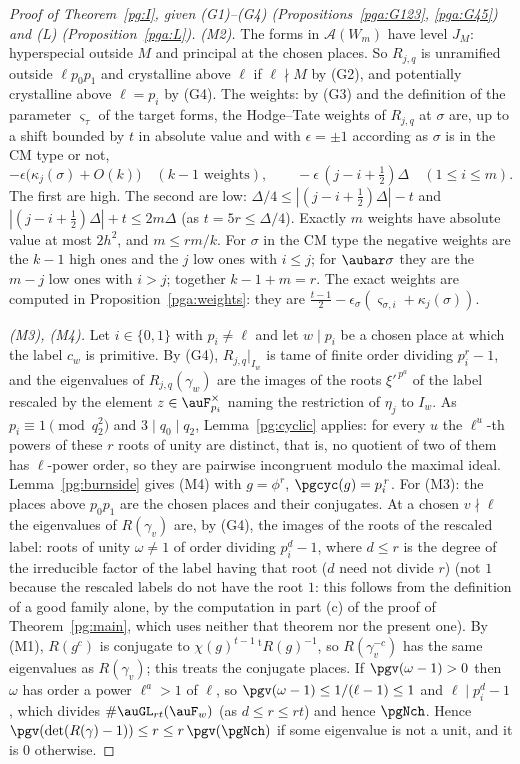 \documentclass[10pt]{amsart}
\theoremstyle{definition}
\theoremstyle{remark}
\begin{document}
\begin{proof}[Proof of Theorem~\ref{pg:I}, given {\rm(G1)--(G4)} (Propositions~\ref{pga:G123}, \ref{pga:G45}) and {\rm(L)} (Proposition~\ref{pga:L})]
\emph{{\rm(M2)}.} The forms in $\mathcal A(W_m)$ have level $J_M$: hyperspecial outside $M$ and
principal at the chosen places. So $R_{j,q}$ is unramified outside $\ell p_0p_1$ and crystalline
above $\ell$ if $\ell\nmid M$ by (G2), and potentially crystalline above $\ell=p_i$ by (G4). The
weights: by (G3) and the definition of the parameter $\varsigma_\tau$ of the target forms, the
Hodge--Tate weights of $R_{j,q}$ at $\sigma$ are, up to a shift bounded by $t$ in absolute value
and with $\epsilon=\pm1$ according as $\sigma$ is in the CM type or not,
\[
-\epsilon\bigl(\kappa_j(\sigma)+O(k)\bigr)\quad(k-1\text{ weights}),\qquad
-\epsilon\,(j-i+\tfrac12)\Delta\quad(1\le i\le m).
\]
The first are high. The second are low: $\Delta/4\le|(j-i+\frac12)\Delta|-t$ and $|(j-i+\frac12)\Delta|+t\le2m\Delta$ (as $t=5r\le\Delta/4$). Exactly
$m$ weights have absolute value at most $2h^2$, and $m\le rm/k$. For $\sigma$ in the CM type the
negative weights are the $k-1$ high ones and the $j$ low ones with $i\le j$; for $\aubar\sigma$
they are the $m-j$ low ones with $i>j$; together $k-1+m=r$. The exact weights are computed in Proposition~\ref{pga:weights}: they are
$\frac{t-1}2-\epsilon_\sigma(\varsigma_{\sigma,i}+\kappa_j(\sigma))$.

\emph{{\rm(M3)}, {\rm(M4)}.} Let $i\in\{0,1\}$ with $p_i\ne\ell$ and let $w\mid p_i$ be a chosen
place at which the label $c_w$ is primitive. By (G4), $R_{j,q}|_{I_w}$ is tame of finite order
dividing $p_i^r-1$, and the eigenvalues of $R_{j,q}(\gamma_w)$ are the images of the roots
$\xi'^{\,p^a}$ of the label rescaled by the element $z\in\auF_{p_i}^\times$ naming the restriction
of $\eta_j$ to $I_w$. As $p_i\equiv1\pmod{q_2^2}$ and $3\mid q_0\mid q_2$, Lemma~\ref{pg:cyclic}
applies: for every $u$ the $\ell^u$-th powers of these $r$ roots of unity are distinct, that is, no
quotient of two of them has $\ell$-power order, so they are pairwise incongruent modulo the
maximal ideal. Lemma~\ref{pg:burnside} gives (M4) with $g=\phi^r$,
$\pgcyc(g)=p_i^{\,r}$. For (M3): the places above $p_0p_1$ are the chosen places and their conjugates. At a chosen
$v\nmid\ell$ the eigenvalues of $R(\gamma_v)$ are, by (G4), the images of the roots of the
rescaled label: roots of unity $\omega\ne1$ of order dividing $p_i^{d}-1$, where $d\le r$ is the degree of the irreducible factor of the label having that root ($d$ need not divide $r$) (not $1$ because the
rescaled labels do not have the root $1$: this follows from the definition of a good family alone, by the computation in part (c) of the proof of Theorem~\ref{pg:main}, which uses neither that theorem nor the present one). By (M1),
$R(g^c)$ is conjugate to $\chi(g)^{t-1}\,{}^{\mathrm t}R(g)^{-1}$, so $R(\gamma_v^{-c})$ has the
same eigenvalues as $R(\gamma_v)$; this treats the conjugate places. If
$\pgv(\omega-1)>0$ then $\omega$ has order a power $\ell^a>1$ of $\ell$, so
$\pgv(\omega-1)\le1/(\ell-1)\le1$ and $\ell\mid p_i^d-1$, which divides $\#\auGL_{rt}(\auF_w)$ (as $d\le r\le rt$) and hence $\pgNch$. Hence
$\pgv(\det(R(\gamma)-1))\le r\le r\,\pgv(\pgNch)$ if some eigenvalue is not a unit, and it is $0$
otherwise.


\end{proof}
\end{document}
